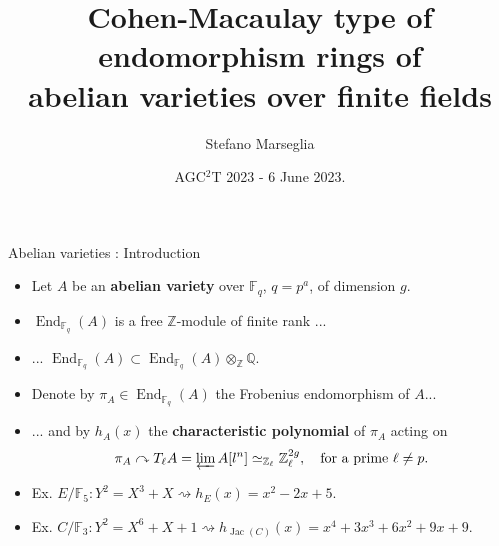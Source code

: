 \documentclass[usenames,dvipsnames,handout]{beamer}
\title[]{Cohen-Macaulay type of endomorphism rings of\\ abelian varieties over finite fields}
\subtitle{\onslide<2->{...or...\\when an abelian variety met Bruns-Herzog's book.}}
\author[Stefano Marseglia]{Stefano Marseglia}
\institute[]{Utrecht University}
\date[6 June 2023]{AGC$^2$T 2023 - 6 June 2023.}
\def\Q{\mathbb{Q}}
\def\Z{\mathbb{Z}}
\def\F{\mathbb{F}}
\DeclareMathOperator{\End}{End}
\DeclareMathOperator{\Jac}{Jac}
\begin{document}
\begin{frame}
\titlepage
\end{frame}

\begin{frame}{ Abelian varieties : Introduction } 
    \begin{itemize}
    \item Let $A$ be an {\bf abelian variety} over $\F_q$, $q=p^a$, of dimension $g$.
    \item \pause $\End_{\F_q}(A)$ is a free $\Z$-module of finite rank ... 
    \item \pause ... $\End_{\F_q}(A) \subset \End_{\F_q}(A)\otimes_\Z\Q$.
    \item \pause Denote by $\pi_A\in \End_{\F_q}(A)$ the Frobenius endomorphism of $A$... 
    \item \pause ... and by $h_A(x)$ the {\bf characteristic polynomial} of $\pi_A$ acting on 
        \[ \pi_A	\curvearrowright T_\ell A = \varprojlim A[l^n] \simeq_{\Z_\ell} \Z_\ell^{2g}, \quad \text{for a prime }\ell \neq p. \]
    \item \pause Ex. $E/\F_5 : Y^2 = X^3 + X \rightsquigarrow h_{E}(x) = x^2 - 2x + 5$.
    \item \pause Ex. $C/\F_3: Y^2=X^6+X+1 \rightsquigarrow h_{\Jac(C)}(x) = 
    x^4 + 3 x^3 + 6 x^2 + 9 x + 9$. 
	\end{itemize}
\end{frame}
\end{document}
